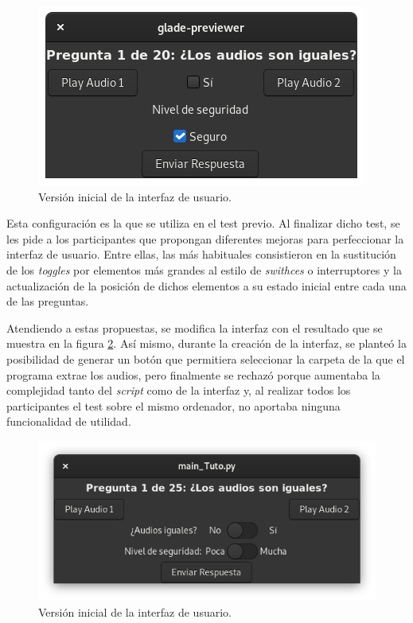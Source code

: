 \documentclass[11pt,a4paper,twoside]{book}
\begin{document}
            \begin{figure}
                \begin{center}
                    \includegraphics[scale=.6]{../imagenes/uiIni.png}
                    \caption{Versión inicial de la interfaz de usuario.}
                    \label{fig:uiIni}
                \end{center}
            \end{figure}
            
            Esta configuración es la que se utiliza en el test previo. Al finalizar dicho test, se les pide a los participantes que propongan diferentes mejoras para perfeccionar la interfaz de usuario. Entre ellas, las más habituales consistieron en la sustitución de los \textit{toggles} por elementos más grandes al estilo de \textit{swithces} o interruptores y la actualización de la posición de dichos elementos a su estado inicial entre cada una de las preguntas.
            
            Atendiendo a estas propuestas, se modifica la interfaz con el resultado que se muestra en la figura \ref{fig:uiFin}. Así mismo, durante la creación de la interfaz, se planteó la posibilidad de generar un botón que permitiera seleccionar la carpeta de la que el programa extrae los audios, pero finalmente se rechazó porque aumentaba la complejidad tanto del \textit{script} como de la interfaz y, al realizar todos los participantes el test sobre el mismo ordenador, no aportaba ninguna funcionalidad de utilidad.
            
            \begin{figure}[H]
                \begin{center}
                    \includegraphics[scale=.6]{../imagenes/interFin.png}
                    \caption{Versión inicial de la interfaz de usuario.}
                    \label{fig:uiFin}
                \end{center}
            \end{figure}
            
\end{document}
